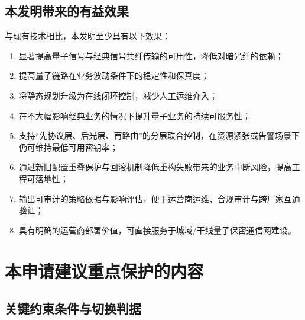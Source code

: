 \documentclass[12pt,a4paper]{article}
\begin{document}
\subsection{本发明带来的有益效果}

与现有技术相比，本发明至少具有以下效果：
\begin{enumerate}[label=(\arabic*)]
    \item 显著提高量子信号与经典信号共纤传输的可用性，降低对暗光纤的依赖；
    \item 提高量子链路在业务波动条件下的稳定性和保真度；
    \item 将静态规划升级为在线闭环控制，减少人工运维介入；
    \item 在不大幅影响经典业务的情况下提升量子业务的持续可服务性；
    \item 支持“先协议层、后光层、再路由”的分层联合控制，在资源紧张或告警场景下仍可维持最低可用密钥率；
    \item 通过新旧配置重叠保护与回滚机制降低重构失败带来的业务中断风险，提高工程可落地性；
    \item 输出可审计的策略依据与影响评估，便于运营商运维、合规审计与跨厂家互通验证；
    \item 具有明确的运营商部署价值，可直接服务于城域/干线量子保密通信网建设。
\end{enumerate}

\section{本申请建议重点保护的内容}

\subsection{关键约束条件与切换判据}
\end{document}
